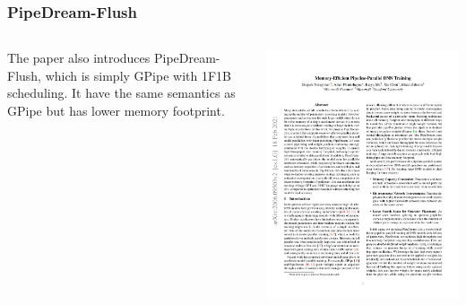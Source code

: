 \documentclass[12pt,aspectratio=169]{beamer}
\begin{document}
    \begin{frame}
        \frametitle{PipeDream-Flush}

        \begin{columns}
            \begin{column}{0.5\textwidth}
                The paper also introduces PipeDream-Flush, which is simply GPipe with 1F1B scheduling. It have the same
                semantics as GPipe but has lower memory footprint.
            \end{column}
            \begin{column}{0.5\textwidth}
                \includegraphics[page=4,trim=2cm 19cm 11cm 1.9cm,clip,scale=0.9]{pipedream-2bw.pdf}
            \end{column}
        \end{columns}
    \end{frame}
\end{document}
